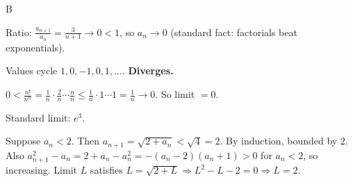 \documentclass[11pt]{article}
\begin{document}
\begin{answers}{B}
\item Ratio: $\tfrac{a_{n+1}}{a_n} = \tfrac{3}{n+1} \to 0 < 1$, so $a_n \to \boxed{0}$ (standard fact: factorials beat exponentials).
\item Values cycle $1, 0, -1, 0, 1, \ldots$. \textbf{Diverges.}
\item $0 < \tfrac{n!}{n^n} = \tfrac{1}{n} \cdot \tfrac{2}{n} \cdots \tfrac{n}{n} \le \tfrac{1}{n} \cdot 1 \cdots 1 = \tfrac{1}{n} \to 0$. So limit $= \boxed{0}$.
\item Standard limit: $\boxed{e^3}$.
\item Suppose $a_n < 2$. Then $a_{n+1} = \sqrt{2 + a_n} < \sqrt 4 = 2$. By induction, bounded by $2$. Also $a_{n+1}^2 - a_n = 2 + a_n - a_n^2 = -(a_n - 2)(a_n + 1) > 0$ for $a_n < 2$, so increasing. Limit $L$ satisfies $L = \sqrt{2 + L} \Rightarrow L^2 - L - 2 = 0 \Rightarrow \boxed{L = 2}$.
\end{answers}
\end{document}
